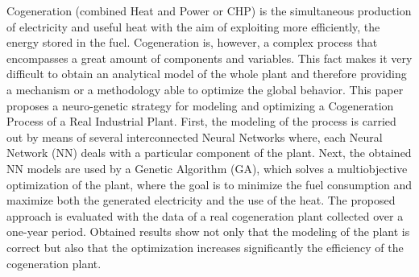 Cogeneration (combined Heat and Power or CHP) is the simultaneous production of electricity and useful heat with the aim of exploiting more efficiently, the energy stored in the fuel. Cogeneration is, however, a complex process that encompasses a great amount of components and variables. This fact makes it very difficult to obtain an analytical model of the whole plant and therefore providing a mechanism or a methodology able to optimize the global behavior. This paper proposes a neuro-genetic strategy for modeling and optimizing a Cogeneration Process of a Real Industrial Plant. First, the modeling of the process is carried out by means of several interconnected Neural Networks where, each Neural Network (NN) deals with a particular component of the plant. Next, the obtained NN models are used by a Genetic Algorithm (GA), which solves a multiobjective optimization of the plant, where the goal is to minimize the fuel consumption and maximize both the generated electricity and the use of the heat. The proposed approach is evaluated with the data of a real cogeneration plant collected over a one-year period. Obtained results show not only that the modeling of the plant is correct but also that the optimization increases significantly the efficiency of the cogeneration plant.
